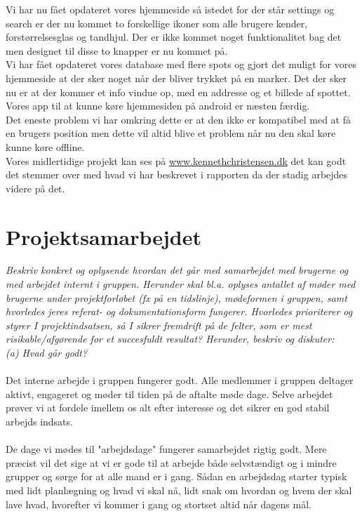 \documentclass[12pt]{article}
\begin{document}
Vi har nu fået opdateret vores hjemmeside så istedet for der står settings og search er der nu kommet to forskellige ikoner som alle brugere kender, forstørrelsesglas og tandhjul. Der er ikke kommet noget funktionalitet bag det men designet til disse to knapper er nu kommet på. \\
Vi har fået opdateret vores database med flere spots og gjort det muligt for vores hjemmeside at der sker noget når der bliver trykket på en marker. Det der sker nu er at der kommer et info vindue op, med en addresse og et billede af spottet.\\
Vores app til at kunne køre hjemmesiden på android er næsten færdig.\\
Det eneste problem vi har omkring dette er at den ikke er kompatibel med at få en brugers position men dette vil altid blive et problem når nu den skal køre kunne køre offline.\\
Vores midlertidige projekt kan ses på \url{www.kennethchristensen.dk} det kan godt det stemmer over med hvad vi har beskrevet i rapporten da der stadig arbejdes videre på det.\\

\pagebreak
\section{Projektsamarbejdet}
\textit{Beskriv konkret og oplysende hvordan det går med samarbejdet med brugerne
og med arbejdet internt i gruppen. Herunder skal bl.a. oplyses antallet af møder med brugerne under
projektforløbet (fx på en tidslinje), mødeformen i gruppen, samt hvorledes jeres referat- og
dokumentationsform fungerer. Hvorledes prioriterer og styrer I projektindsatsen, så I sikrer
fremdrift på de felter, som er mest risikable/afgørende for et succesfuldt resultat? Herunder, beskriv
og diskuter:}\\

\textit{(a) Hvad går godt?}\\\\
Det interne arbejde i gruppen fungerer godt. Alle medlemmer i gruppen deltager aktivt, engageret og møder til tiden på de aftalte møde dage. Selve arbejdet prøver vi at fordele imellem os alt efter interesse og det sikrer en god stabil arbejds indsats.\\\\
 De dage vi mødes til "arbejdsdage" fungerer samarbejdet rigtig godt. Mere præcist vil det sige at vi er gode til at arbejde både selvstændigt og i mindre grupper og sørge for at alle mand er i gang. Sådan en arbejdsdag starter typisk med lidt planlægning og hvad vi skal nå, lidt snak om hvordan og hvem der skal lave hvad, hvorefter vi kommer i gang og stortset altid når dagens mål.\\
\end{document}
